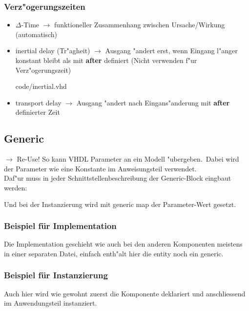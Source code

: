 \begin{multicols}{2}
	\subsubsection{Verz"ogerungszeiten}  %
	\begin{itemize}
		\itemsep0em
		\item $\Delta$-Time $\rightarrow$ funktioneller Zusammenhang 
			zwischen Ursache/Wirkung (automatisch)
		\item inertial delay (Tr"agheit) $\rightarrow$ Ausgang "andert erst, wenn Eingang l"anger konstant bleibt als mit \textbf{after} definiert (Nicht verwenden f"ur Verz"ogerungszeit)
		\vfill\null
		\columnbreak
		
				{code/inertial.vhd}
		\item transport delay $\rightarrow$ Ausgang "andert nach Eingans"anderung mit \textbf{after} definierter Zeit 
			
	\end{itemize}
\end{multicols}
	
\begin{multicols}{2}
	\subsection{Generic}
	$\rightarrow$ Re-Use! So kann VHDL Parameter an ein Modell 
	"ubergeben.\ Dabei wird der Parameter wie eine Konstante im Anweisungsteil verwendet.\\
	Daf"ur muss in jeder Schnittstellenbeschreibung der Generic-Block eingbaut werden:
	
	Und bei der Instanzierung wird mit generic map der Parameter-Wert gesetzt.

	\subsubsection{Beispiel für Implementation}
	Die Implementation geschieht wie auch bei den anderen 
	Komponenten meistens in einer separaten Datei, einfach enth"alt hier die entity noch ein generic.
	
	\vfill\null
	\columnbreak
	\subsubsection{Beispiel für Instanzierung}
	Auch hier wird wie gewohnt zuerst die Komponente deklariert und 
	anschliessend im Anwendungsteil instanziert.
	
\end{multicols}